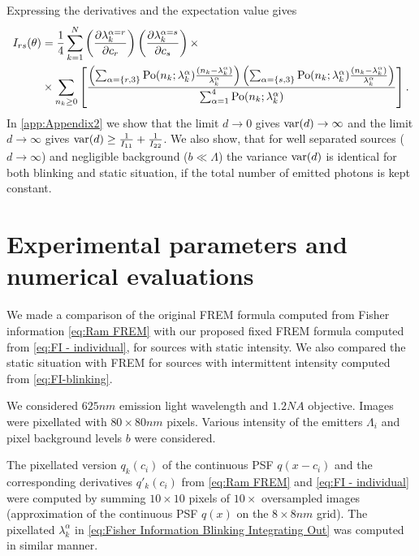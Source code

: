 Expressing the derivatives and the expectation value gives
%
\begin{alignat}{2}
	I_{rs}(\theta)
	&=\frac{1}{4}\sum_{k=1}^N\left(\frac{\partial\lambda_k^{\alpha=r}}{\partial c_r}\right)\left(\frac{\partial\lambda_k^{\alpha=s}}{\partial c_s}\right)\times \nonumber\\
	&\times \sum_{n_k\geq0}\left[\frac{\left(\sum_{\alpha=\{r,3\}}\mathrm{Po}(n_k;\lambda_k^\alpha)\frac{(n_k-\lambda_k^\alpha)}{\lambda_k^\alpha}\right)\left(\sum_{\alpha=\{s,3\}}\mathrm{Po}(n_k;\lambda_k^\alpha)\frac{(n_k-\lambda_k^\alpha)}{\lambda_k^\alpha}\right)}{\sum_{\alpha=1}^4\mathrm{Po}(n_k;\lambda_k^\alpha)}\right].
	\label{eq:FI-blinking}
\end{alignat}
%
In \autoref{app:Appendix2} we show that the limit $d\rightarrow0$ gives $\mathrm{var}(d)\rightarrow\infty$ and the limit $d\rightarrow\infty$ gives $\mathrm{var}(d)\geq\frac{1}{I_{11}}+\frac{1}{I_{22}}$. We also show, that for well separated sources ($d\rightarrow\infty$) and negligible background ($b\ll\Lambda$) the variance $\mathrm{var}(d)$ is identical for both blinking and static situation, if the total number of emitted photons is kept constant. 

\clearpage
\section{Experimental parameters and numerical evaluations\label{sec:FREM simulations}} 
We made a comparison of the original FREM formula computed from Fisher information \autoref{eq:Ram FREM} with our proposed fixed FREM formula computed from \autoref{eq:FI - individual}, for sources with static intensity. We also compared the static situation with FREM for sources with intermittent intensity computed from \autoref{eq:FI-blinking}.

We considered $625\unit{nm}$ emission light wavelength and $1.2\unit{NA}$ objective. Images were pixellated with $80\times80\unit{nm}$ pixels. Various intensity of the emitters $\Lambda_i$ and pixel background levels $b$ were considered.

The pixellated version $q_k(c_i)$ of the continuous PSF $q(x-c_i)$ and the corresponding derivatives $q'_k(c_i)$ from \autoref{eq:Ram FREM} and \autoref{eq:FI - individual} were computed by summing $10\times10$ pixels of $10\times$ oversampled images (approximation of the continuous PSF $q(x)$ on the $8\times8 \unit{nm}$ grid). The pixellated $\lambda^\alpha_k$ in \autoref{eq:Fisher Information Blinking Integrating Out} was computed in similar manner. 


